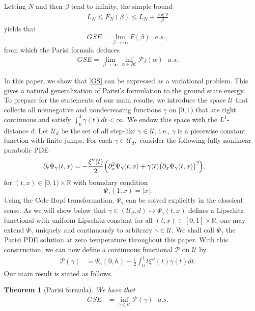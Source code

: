 \documentclass[12pt]{article}
\newtheorem{theorem}{\bf Theorem}
\newenvironment{Proof of lemma}{\noindent{\bf Proof of Lemma}}{\hfill$\Box$\newline}
\newenvironment{Proof of theorem}{\noindent{\bf Proof of Theorem}}{\hfill{\footnotesize${\square}$}\newline}
\newenvironment{Proof of theorems}{\noindent{\bf Proof of Theorems}}{\hfill$\Box$\newline}
\newenvironment{Proof of proposition}{\noindent{\bf Proof of Proposition}}{\hfill$\Box$\newline}
\newenvironment{Proof of propositions}{\noindent{\bf Proof of Propositions}}{\hfill$\Box$\newline}
\newenvironment{Proof of exercise}{\noindent{\it Proof of Exercise:}}{\hfill$\Box$}
\begin{document}
Letting $N$ and then $\beta$ tend to infinity, the simple bound
\begin{align*}
L_N\leq F_N(\beta)\leq L_N+\frac{\log 2}{\beta}
\end{align*}
 yields that 
$$
GSE=\lim_{\beta\rightarrow\infty}F(\beta)\,\,\,\,a.s.,
$$
from which the Parisi formula deduces 
\begin{align}\label{GS}
GSE=\lim_{\beta\rightarrow\infty}\inf_{\alpha\in\mathcal{M}}\mathcal{P}_\beta(\alpha)\,\,\,\,a.s.
\end{align} 

In this paper, we show that \eqref{GS} can be expressed as a variational problem. This gives a natural generalization of Parisi's formulation to the ground state energy. To prepare for the statements of our main results, we introduce the space $\mathcal{U}$ that collects all nonnegative and nondecreasing functions $\gamma$ on $[0,1)$ that are right continuous and satisfy $\int_0^1\gamma(t)dt<\infty$. We endow this space with the $L^1$-distance $d$. Let $\mathcal{U}_d$ be the set of all step-like $\gamma\in \mathcal U$, i.e., $\gamma$ is a piecewise constant function with finite jumps. For each $\gamma\in\mathcal{U}_d,$ consider the following fully nonlinear parabolic PDE 
	\begin{align}\label{pde3}
	\partial_t{\Psi}_{\gamma}(t,x)&=-\frac{\xi''(t)}{2}\Bigl(\partial_x^2{\Psi}_{\gamma}(t,x)+\gamma(t)\bigl(\partial_x{\Psi}_{\gamma}(t,x)\bigr)^2\Bigr),
	\end{align}
	for $(t,x)\in[0,1)\times\mathbb{R}$ with boundary condition 	 $${\Psi}_\gamma(1,x)=|x|.$$ Using the Cole-Hopf transformation, $\Psi_\gamma$ can be solved explicitly in the classical sense. As we will show below that $\gamma\in(\mathcal{U}_d,d)\mapsto\Psi_\gamma(t,x)$ defines a Lipschitz functional with uniform Lipschitz constant for all $(t,x)\in[0,1]\times\mathbb{R}$, one may extend $\Psi_{\gamma}$ uniquely and continuously to arbitrary $\gamma\in\mathcal{U}.$ We shall call $\Psi_\gamma$ the Parisi PDE solution at zero temperature throughout this paper. With this construction, we can now define a continuous functional $\mathcal{P}$ on $\mathcal{U}$ by
	\begin{align*}
	\mathcal{P}(\gamma)&=\Psi_{\gamma}(0,h)-\frac{1}{2}\int_0^1t\xi''(t)\gamma(t)dt.
	\end{align*}	
    Our main result is stated as follows.
	
\begin{theorem}[Parisi formula]
	\label{thm}
	We have that
	\begin{align}
	\label{thm:eq1}
	GSE&=\inf_{\gamma\in\mathcal{U}}\mathcal{P}(\gamma)\,\,\,\,a.s.
	\end{align}
\end{theorem}
\end{document}
